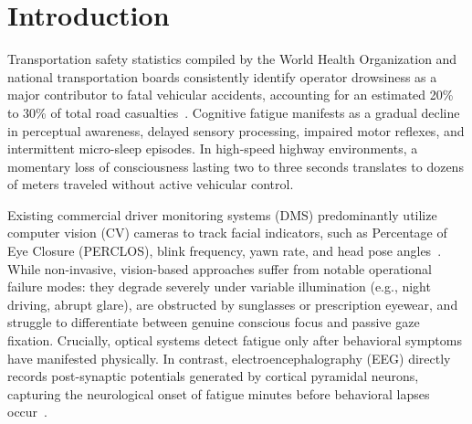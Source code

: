 \documentclass[conference]{IEEEtran}
\begin{document}
\section{Introduction}
\label{sec:introduction}

Transportation safety statistics compiled by the World Health Organization and national transportation boards consistently identify operator drowsiness as a major contributor to fatal vehicular accidents, accounting for an estimated 20\% to 30\% of total road casualties~\cite{who2023road}. Cognitive fatigue manifests as a gradual decline in perceptual awareness, delayed sensory processing, impaired motor reflexes, and intermittent micro-sleep episodes. In high-speed highway environments, a momentary loss of consciousness lasting two to three seconds translates to dozens of meters traveled without active vehicular control.

Existing commercial driver monitoring systems (DMS) predominantly utilize computer vision (CV) cameras to track facial indicators, such as Percentage of Eye Closure (PERCLOS), blink frequency, yawn rate, and head pose angles~\cite{zheng2017seedvig}. While non-invasive, vision-based approaches suffer from notable operational failure modes: they degrade severely under variable illumination (e.g., night driving, abrupt glare), are obstructed by sunglasses or prescription eyewear, and struggle to differentiate between genuine conscious focus and passive gaze fixation. Crucially, optical systems detect fatigue only after behavioral symptoms have manifested physically. In contrast, electroencephalography (EEG) directly records post-synaptic potentials generated by cortical pyramidal neurons, capturing the neurological onset of fatigue minutes before behavioral lapses occur~\cite{dong2021driver}.
\end{document}
